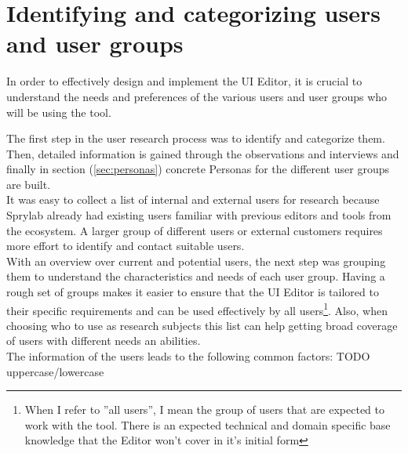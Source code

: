 \section{Identifying and categorizing users and user groups}
\label{sec:user-groups}
In order to effectively design and implement the UI Editor, it is crucial to understand the needs and preferences of the various users and user groups who will be using the tool.

The first step in the user research process was to identify and categorize them.
Then, detailed information is gained through the observations and interviews and finally in section (\ref{sec:personas}) concrete Personas for the different user groups are built.
\\
It was easy to collect a list of internal and external users for research because Sprylab already had existing users familiar with previous editors and tools from the ecosystem.
A larger group of different users or external customers requires more effort to identify and contact suitable users.
\\
With an overview over current and potential users, the next step was grouping them to understand the characteristics and needs of each user group.
Having a rough set of groups makes it easier to ensure that the UI Editor is tailored to their specific requirements and can be used effectively by all users\footnote{When I refer to ''all users'', I mean the group of users that are expected to work with the tool. There is an expected technical and domain specific base knowledge that the Editor won't cover in it's initial form}.
Also, when choosing who to use as research subjects this list can help getting broad coverage of users with different needs an abilities.
\\
The information of the users leads to the following common factors:
TODO uppercase/lowercase
